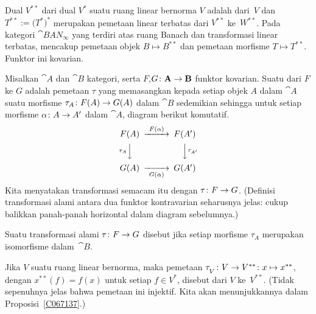 \begin{exam}\label{C057717}
Dual $V^{**}$ dari dual $V^*$ suatu ruang linear bernorma $V$ adalah  dari~$V$
dan $T^{**} := \bigl(T^*\bigr)^*$ merupakan pemetaan linear terbatas dari $V^{**}$ ke~$W^{**}$.  Pada kategori
$\cat{BAN_{\boldsymbol\infty}}$ yang terdiri atas ruang Banach dan transformasi linear terbatas,
 mencakup pemetaan objek $B \mapsto B^{**}$ dan pemetaan morfisme $T \mapsto T^{**}$.
Funktor ini kovarian.
\end{exam}

\begin{defn}\label{defn_nat_transf} Misalkan $\cat A$ dan $\cat B$ kategori, serta $F$,$G \colon \mathbf{A} \rightarrow \mathbf{B}$
funktor kovarian.  Suatu
 dari $F$ ke $G$ adalah pemetaan $\tau$ yang memasangkan kepada setiap objek
$A$ dalam $\cat A$ suatu morfisme $\tau_A \colon F(A) \rightarrow G(A)$ dalam $\cat B$ sedemikian sehingga
untuk setiap morfisme $\alpha \colon A \rightarrow A'$ dalam $\cat A$, diagram berikut komutatif.
   \[ \CD
      F(A) @>  F(\alpha)>>  F(A')  \\
         @V\tau_AVV                @VV\tau_{A'}V  \\
      G(A) @>> G(\alpha)>  G(A')
   \endCD \]
Kita menyatakan transformasi semacam itu dengan $\tau \colon F \rightarrow G$. (Definisi transformasi alami
antara dua funktor kontravarian seharusnya jelas: cukup balikkan
panah-panah horizontal dalam diagram sebelumnya.)

Suatu transformasi alami $\tau \colon  F \rightarrow G$ disebut
 jika setiap morfisme $\tau_A$ merupakan isomorfisme dalam~$\cat B$.
\end{defn}

\begin{defn}\label{defn_nat_embed} Jika $V$ suatu ruang linear bernorma, maka pemetaan $\tau_{{}_{\scriptstyle{V}}} \colon V \rightarrow V^{**} \colon x
\mapsto x^{**}$, dengan $x^{**}(f) = f(x)$ untuk setiap $f \in V^*$, disebut
 dari $V$ ke~$V^{**}$. (Tidak sepenuhnya jelas bahwa pemetaan ini
injektif. Kita akan menunjukkannya dalam Proposisi~\ref{C067137}.)
\end{defn}

